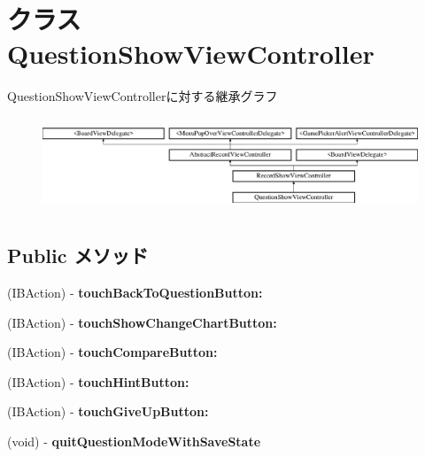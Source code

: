 \hypertarget{interface_question_show_view_controller}{
\section{クラス QuestionShowViewController}
\label{interface_question_show_view_controller}
}
QuestionShowViewControllerに対する継承グラフ\begin{figure}[H]
\begin{center}
\leavevmode
\includegraphics[height=2.839037cm]{interface_question_show_view_controller}
\end{center}
\end{figure}
\subsection*{Public メソッド}
\begin{DoxyCompactItemize}
\item 
\hypertarget{interface_question_show_view_controller_a7d6b2501bcd359a8188616e82c381ec8}{
(IBAction) -\/ {\bfseries touchBackToQuestionButton:}}
\label{interface_question_show_view_controller_a7d6b2501bcd359a8188616e82c381ec8}

\item 
\hypertarget{interface_question_show_view_controller_a0ec37f9f15052ef586da0426bc38c891}{
(IBAction) -\/ {\bfseries touchShowChangeChartButton:}}
\label{interface_question_show_view_controller_a0ec37f9f15052ef586da0426bc38c891}

\item 
\hypertarget{interface_question_show_view_controller_af85cd91bc53e301335ee9ab9ed7de115}{
(IBAction) -\/ {\bfseries touchCompareButton:}}
\label{interface_question_show_view_controller_af85cd91bc53e301335ee9ab9ed7de115}

\item 
\hypertarget{interface_question_show_view_controller_aef4fec4b3cdc4db59d7656dd26a7b121}{
(IBAction) -\/ {\bfseries touchHintButton:}}
\label{interface_question_show_view_controller_aef4fec4b3cdc4db59d7656dd26a7b121}

\item 
\hypertarget{interface_question_show_view_controller_af500c36f55f5f536feec911066789dc5}{
(IBAction) -\/ {\bfseries touchGiveUpButton:}}
\label{interface_question_show_view_controller_af500c36f55f5f536feec911066789dc5}

\item 
\hypertarget{interface_question_show_view_controller_aa55302a5402cc5ca43a5856ebc944e79}{
(void) -\/ {\bfseries quitQuestionModeWithSaveState}}
\label{interface_question_show_view_controller_aa55302a5402cc5ca43a5856ebc944e79}

\end{DoxyCompactItemize}


